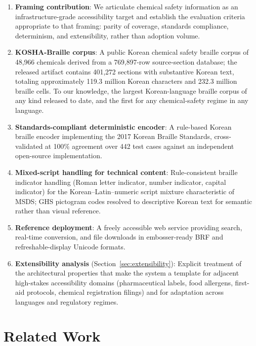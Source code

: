 \documentclass[journal]{IEEEtran}
\begin{document}
\begin{enumerate}
\item \textbf{Framing contribution}: We articulate chemical safety information as an infrastructure-grade accessibility target and establish the evaluation criteria appropriate to that framing: parity of coverage, standards compliance, determinism, and extensibility, rather than adoption volume.

\item \textbf{KOSHA-Braille corpus}: A public Korean chemical safety braille corpus of 48,966 chemicals derived from a 769,897-row source-section database; the released artifact contains 401,272 sections with substantive Korean text, totaling approximately 119.3 million Korean characters and 232.3 million braille cells. To our knowledge, the largest Korean-language braille corpus of any kind released to date, and the first for any chemical-safety regime in any language.

\item \textbf{Standards-compliant deterministic encoder}: A rule-based Korean braille encoder implementing the 2017 Korean Braille Standards, cross-validated at 100\% agreement over 442 test cases against an independent open-source implementation.

\item \textbf{Mixed-script handling for technical content}: Rule-consistent braille indicator handling (Roman letter indicator, number indicator, capital indicator) for the Korean--Latin--numeric script mixture characteristic of MSDS; GHS pictogram codes resolved to descriptive Korean text for semantic rather than visual reference.

\item \textbf{Reference deployment}: A freely accessible web service providing search, real-time conversion, and file downloads in embosser-ready BRF and refreshable-display Unicode formats.

\item \textbf{Extensibility analysis} (Section~\ref{sec:extensibility}): Explicit treatment of the architectural properties that make the system a template for adjacent high-stakes accessibility domains (pharmaceutical labels, food allergens, first-aid protocols, chemical registration filings) and for adaptation across languages and regulatory regimes.
\end{enumerate}

\section{Related Work}
\label{sec:related}
\end{document}
